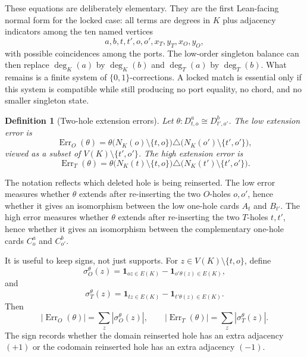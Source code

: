 \documentclass[11pt]{article}
\newtheorem{definition}{Definition}
\newcommand{\Err}{\operatorname{Err}}
\newcommand{\one}{\mathbf{1}}
\begin{document}
These equations are deliberately elementary.  They are the first Lean-facing
normal form for the locked case: all terms are degrees in \(K\) plus
adjacency indicators among the ten named vertices
\[
  a,b,t,t',o,o',x_T,y_T,x_O,y_O,
\]
with possible coincidences among the ports.  The low-order singleton balance
can then replace \(\deg_K(a)\) by \(\deg_K(b)\) and
\(\deg_T(a)\) by \(\deg_T(b)\).  What remains is a finite system of
\(\{0,1\}\)-corrections.  A locked match is essential only if this system is
compatible while still producing no port equality, no chord, and no smaller
singleton state.

\begin{definition}[Two-hole extension errors]
Let \(\theta:D_{t,o}^a\cong D_{t',o'}^b\).  The low extension error is
\[
  \Err_O(\theta)
  =
  \theta\bigl(N_K(o)\setminus\{t,o\}\bigr)
  \triangle
  \bigl(N_K(o')\setminus\{t',o'\}\bigr),
\]
viewed as a subset of \(V(K)\setminus\{t',o'\}\).  The high extension error
is
\[
  \Err_T(\theta)
  =
  \theta\bigl(N_K(t)\setminus\{t,o\}\bigr)
  \triangle
  \bigl(N_K(t')\setminus\{t',o'\}\bigr).
\]
\end{definition}

The notation reflects which deleted hole is being reinserted.  The low error
measures whether \(\theta\) extends after re-inserting the two \(O\)-holes
\(o,o'\), hence whether it gives an isomorphism between the low one-hole
cards \(A_t\) and \(B_{t'}\).  The high error measures whether \(\theta\)
extends after re-inserting the two \(T\)-holes \(t,t'\), hence whether it
gives an isomorphism between the complementary one-hole cards \(C_o^a\) and
\(C_{o'}^b\).

It is useful to keep signs, not just supports.  For
\(z\in V(K)\setminus\{t,o\}\), define
\[
  \sigma_O^\theta(z)
  =
  \one_{oz\in E(K)}-\one_{o'\theta(z)\in E(K)},
\]
and
\[
  \sigma_T^\theta(z)
  =
  \one_{tz\in E(K)}-\one_{t'\theta(z)\in E(K)}.
\]
Then
\[
  |\Err_O(\theta)|=\sum_z |\sigma_O^\theta(z)|,
  \qquad
  |\Err_T(\theta)|=\sum_z |\sigma_T^\theta(z)|.
\]
The sign records whether the domain reinserted hole has an extra adjacency
\((+1)\) or the codomain reinserted hole has an extra adjacency \((-1)\).
\end{document}

